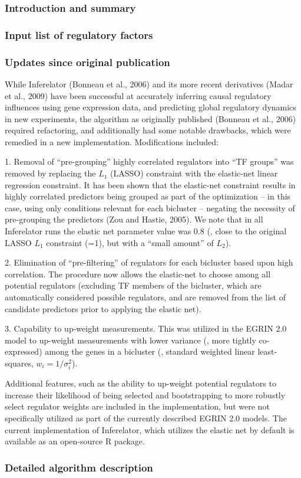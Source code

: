 \subsubsection{Introduction and summary}

\subsubsection{Input list of regulatory factors}

\subsubsection{Updates since original publication}

While Inferelator (Bonneau et al., 2006) and its more recent
derivatives (Madar et al., 2009) have been successful at accurately
inferring causal regulatory influences using gene expression data, and
predicting global regulatory dynamics in new experiments, the
algorithm as originally published (Bonneau et al., 2006) required
refactoring, and additionally had some notable drawbacks, which were
remedied in a new implementation. Modifications included:

1. Removal of ``pre-grouping'' highly correlated regulators into ``TF
groups'' was removed by replacing the $L_1$ (LASSO) constraint with the
elastic-net linear regression constraint. It has been shown that the
elastic-net constraint results in highly correlated predictors being
grouped as part of the optimization – in this case, using only
conditions relevant for each bicluster – negating the necessity of
pre-grouping the predictors (Zou and Hastie, 2005). We note that in
all Inferelator runs the elastic net parameter value was 0.8 (\ie,
close to the original LASSO $L_1$ constraint (=1), but with a “small
amount” of $L_2$).

2. Elimination of ``pre-filtering'' of regulators for each bicluster based
upon high correlation. The procedure now allows the elastic-net to
choose among all potential regulators (excluding TF members of the
bicluster, which are automatically considered possible regulators,
and are removed from the list of candidate predictors prior to
applying the elastic net).

3. Capability to up-weight measurements. This was utilized in the
EGRIN 2.0 model to up-weight measurements with lower variance (\ie,
more tightly co-expressed) among the genes in a bicluster (\ie,
standard weighted linear least-squares, $w_i=1/\sigma_i^2$).

Additional features, such as the ability to up-weight potential
regulators to increase their likelihood of being selected and
bootstrapping to more robustly select regulator weights are included
in the implementation, but were not specifically utilized as part of
the currently described EGRIN 2.0 models. The current implementation of
Inferelator, which utilizes the elastic net by default is available as
an open-source R package.

\subsubsection{Detailed algorithm description}
